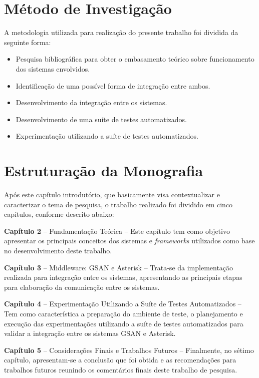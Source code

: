\section*{Método de Investigação}
A metodologia utilizada para realização do presente trabalho foi dividida da seguinte forma:
\begin{itemize}
	\item Pesquisa bibliográfica para obter o embasamento teórico sobre funcionamento dos sistemas envolvidos.
	\item Identificação de uma possível forma de integração entre ambos.
	\item Desenvolvimento da integração entre os sistemas.
	\item Desenvolvimento de uma suíte de testes automatizados.
	\item Experimentação utilizando a suíte de testes automatizados.
\end{itemize}

\section*{Estruturação da Monografia}
	
Após este capítulo introdutório, que basicamente visa contextualizar e caracterizar o tema de pesquisa, o trabalho realizado foi dividido em cinco capítulos, conforme descrito abaixo:
\begin{description}
	\item \textbf{Capítulo 2 } – Fundamentação Teórica – Este capítulo tem como objetivo apresentar os principais conceitos dos sistemas e \textit{frameworks} utilizados como base no desenvolvimento deste trabalho.
	\item \textbf{Capítulo  3} – Middleware: GSAN e Asterisk – Trata-se da implementação realizada para integração entre os sistemas, apresentando as principais etapas para elaboração da comunicação entre os sistemas.
	\item \textbf{Capítulo  4} – Experimentação Utilizando a Suíte de Testes Automatizados – Tem como característica a preparação do ambiente de teste, o planejamento e execução das experimentações utilizando a suíte de testes automatizados para validar a integração entre os sistemas GSAN e Asterisk.
	\item \textbf{Capítulo 5} – Considerações Finais e Trabalhos Futuros – Finalmente, no sétimo capítulo, apresentam-se a conclusão que foi obtida e as recomendações para trabalhos futuros reunindo os comentários finais deste trabalho de pesquisa.	
\end{description}
	

